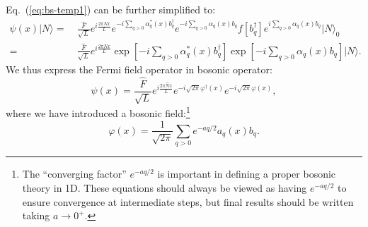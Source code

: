 \documentclass[aps,prb,superscriptaddress,nofootinbib]{revtex4}
\begin{document}
Eq.~(\ref{eq:bs-temp1}) can be further simplified to:
\begin{equation*}
\begin{aligned}
	\psi(x)|N\rangle 
	=&\ \frac{\hat{F}}{\sqrt{L}} e^{i \frac{2 \pi \hat{N} x}{L}} e^{-i\sum_{q>0} \alpha^*_{q}(x) b_{q}^{\dagger}} e^{-i\sum_{q>0} \alpha_{q}(x) b_{q}} f\left[b_{q}^{\dagger}\right] e^{i\sum_{q>0} \alpha_{q}(x) b_{q}} |N\rangle_{0} \\
	=&\ \frac{\hat{F}}{\sqrt{L}} e^{i \frac{2 \pi \hat{N} x}{L}} \exp \left[-i\sum_{q>0} \alpha^*_{q}(x) b_{q}^{\dagger}\right] \exp \left[-i\sum_{q>0} \alpha_{q}(x) b_{q}\right]|N\rangle.
\end{aligned}
\end{equation*}
We thus express the Fermi field operator in bosonic operator:
\begin{equation}\label{eq:bs-fermi-field-1}
	\psi(x) = \frac{\hat{F}}{\sqrt{L}} e^{i \frac{2 \pi \hat{N} x}{L}} e^{-i\sqrt{2\pi}\varphi^\dagger(x)} e^{-i\sqrt{2\pi}\varphi(x)},
\end{equation}
where we have introduced a bosonic field:\footnote{The ``converging factor'' $e^{-a q / 2}$ is important in defining a proper bosonic theory in 1D. These equations should always be viewed as having $e^{-a q / 2}$ to ensure convergence at intermediate steps, but final results should be written taking $a \rightarrow 0^{+}$.}
\begin{equation}
	\varphi(x) = \frac{1}{\sqrt{2\pi}}\sum_{q>0} e^{-a q/2} a_{q}(x) b_{q}.
\end{equation}
\end{document}
